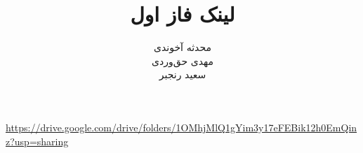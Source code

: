 \documentclass{article}
\title{لینک فاز اول}
\author{
محدثه آخوندی \\
مهدی حق‌وردی \\
سعید رنجبر
}
\date{}
\begin{document}
\maketitle
\begin{flushleft}
\url{https://drive.google.com/drive/folders/1OMhjMlQ1gYim3y17eFEBik12h0EmQinz?usp=sharing}
\end{flushleft}
\end{document}
